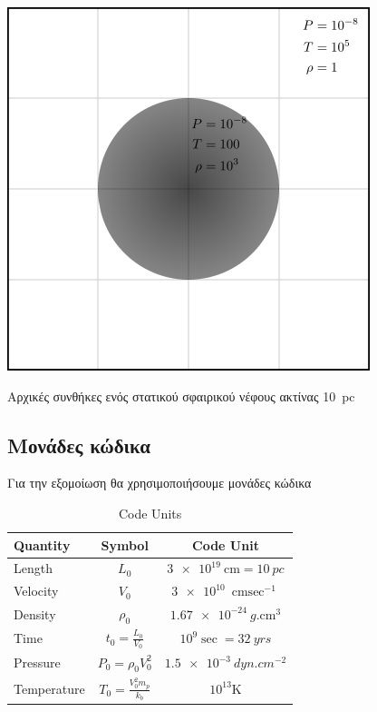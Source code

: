 \documentclass[article,a4paper,11.2pt]{memoir}
\numberwithin{equation}{subsection}
\begin{document}
			\begin{marginfigure}
				\centering
				\includegraphics[width=0.7\linewidth]{Images/rect4578.png}
				\caption{Αρχικές συνθήκες ενός στατικού σφαιρικού νέφους ακτίνας \SI{10}{pc}}
				\label{fig:rect4578}
			\end{marginfigure}
		
	\subsection{Μονάδες κώδικα}
	Για την εξομοίωση θα χρησιμοποιήσουμε μονάδες κώδικα 
	
			\begin{table}[H]
				\centering
				\caption{Code Units}
				\label{tab:cd}
				\begin{tabular}{|l|  c |  c|}
					\toprule
					Quantity & Symbol & Code Unit\\ 
					\midrule
					Length & $L_0$ & $\SI{3e19}{\cm} = \SI{10}{pc}$ \\
					Velocity & $V_0$ & $\SI{3e10}{\cm \sec^{-1}}$\\
					Density& $\rho_0$&$\SI{1.67e-24}{g.\cm^3}$\\
					Time & $t_0=\frac{L_0}{V_0}$ & $10^9\si{\sec} =\SI{32}{yrs}$\\
					Pressure & $P_0=\rho_0 V_0^2$ &$\SI{1.5e-3}{dyn.cm^{-2}}$ \\
					Temperature &$T_0=\frac{V_0^2m_p}{k_b}$&$10^{13}\si{\kelvin}$  \\		
					\bottomrule
				\end{tabular}
			\end{table}
\end{document}
